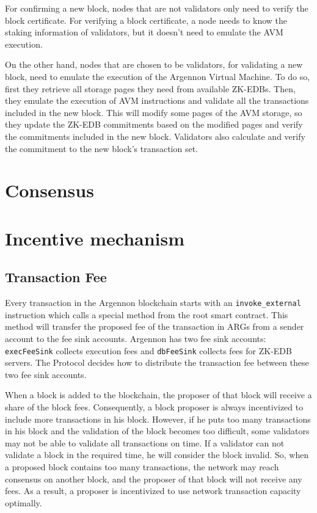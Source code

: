 For confirming a new block, nodes that are not validators only need to verify the block certificate. For
verifying a block certificate, a node needs to know the staking information of validators, but it doesn't need to
emulate the AVM execution.

On the other hand, nodes that are chosen to be validators, for validating a new block, need to emulate the
execution of the Argennon Virtual Machine. To do so, first they retrieve all storage pages they
need from available ZK-EDBs. Then, they emulate the execution of AVM instructions and validate all the
transactions included in the new block. This will modify some pages of the AVM storage, so they update the ZK-EDB
commitments based on the modified pages and verify the commitments included in the new block. Validators also
calculate and verify the commitment to the new block's transaction set.



\section{Consensus}\label{sec:consensus}


\section{Incentive mechanism}\label{sec:incentive-mechanism}

\subsection{Transaction Fee}\label{subsec:transaction-fee}

Every transaction in the Argennon blockchain starts with an \texttt{invoke\_external} instruction which calls a
special method from the root smart contract. This method will transfer the proposed fee of the transaction in ARGs
from a sender account to the fee sink accounts. Argennon has two fee sink accounts: \texttt{execFeeSink} collects
execution fees and \texttt{dbFeeSink} collects fees for ZK-EDB servers. The Protocol decides how to distribute the
transaction fee between these two fee sink accounts.

When a block is added to the blockchain, the proposer of that block will receive a share of the block fees.
Consequently, a block proposer is always incentivized to include more transactions in his block. However, if he
puts too many transactions in his block and the validation of the block becomes too difficult, some validators
may not be able to validate all transactions on time. If a validator can not validate a block in the required
time, he will consider the block invalid. So, when a proposed block contains too many transactions, the network
may reach consensus on another block, and the proposer of that block will not receive any fees. As a result, a
proposer is incentivized to use network transaction capacity optimally.

